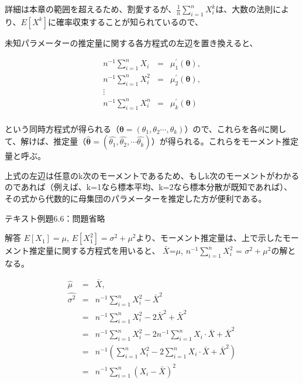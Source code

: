 \documentclass[a4paper,dvipdfmx]{jsarticle}
\begin{document}
詳細は本章の範囲を超えるため、割愛するが、$\frac{1}{n}\sum_{i=1}^{n}X_i^k$は、大数の法則により、$E[X^k]$に確率収束することが知られているので、

未知パラメーターの推定量に関する各方程式の左辺を置き換えると、

\begin{eqnarray*}
  n^{-1}\sum_{i=1}^{n}X_{i} & = & \mu_{1}^{\prime}(\bm{\theta}),  \\
  n^{-1}\sum_{i=1}^{n}X_{i}^{2} & = & \mu_{2}^{\prime}(\bm{\theta}), \\
  \vdots \\
  n^{-1}\sum_{i=1}^{n}X_{i}^{n} & = & \mu_{k}^{\prime}(\bm{\theta}) \\
\end{eqnarray*}

という同時方程式が得られる（$\bm{\theta}=(\theta_1, \theta_2 \cdots ,\theta_k)$）ので、これらを各$\theta$に関して、解けば、推定量（$\bm{\hat{\theta}}=(\hat{\theta_1}, \hat{\theta_2}, \cdots \hat{\theta_k})$）が得られる。これらをモーメント推定量と呼ぶ。

上式の左辺は任意のk次のモーメントであるため、もしk次のモーメントがわかるのであれば（例えば、k=1なら標本平均、k=2なら標本分散が既知であれば）、その式から代数的に母集団のパラメーターを推定した方が便利である。

\vspace{\baselineskip}
テキスト例題6.6：問題省略

\begin{itembox}[c]{解答}
  $E[X_1]=\mu$,  $E[X_1^2]=\sigma^2+\mu^2$より、モーメント推定量は、上で示したモーメント推定量に関する方程式を用いると、
  $\bar{X}$=$\mu$, $n^{-1}\sum_{i=1}^{n}X_{i}^2$ = $\sigma^2 + \mu^2$の解となる。

\begin{eqnarray*}
\hat{\mu} &=& \bar{X},\\
\hat{\sigma^2} &=& n^{-1}\sum_{i=1}^{n}X_{i}^2 - \bar{X}^2 \\
&=& n^{-1}\sum_{i=1}^{n}X_{i}^2 -2 \bar{X}^2 + \bar{X}^2 \\
&=& n^{-1}\sum_{i=1}^{n}X_{i}^2 -2 n^{-1}\sum_{i=1}^{n}X_{i} \cdot \bar{X} + \bar{X}^2 \\
&=& n^{-1} (\sum_{i=1}^{n}X_{i}^2 - 2 \sum_{i=1}^{n}X_{i} \cdot \bar{X} + \bar{X}^2 ) \\
&=& n^{-1} \sum_{i=1}^{n} (X_{i}-\bar{X})^2 \\
\end{eqnarray*}
\end{itembox}
\end{document}
